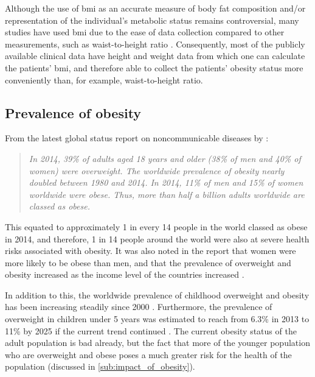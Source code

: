 Although the use of \gls{bmi} as an accurate measure of body fat composition and/or representation of the individual's metabolic status remains controversial, many studies have used \gls{bmi} due to the ease of data collection compared to other measurements, such as waist-to-height ratio \citep{Lee2008, Gelber2008}.
Consequently, most of the publicly available clinical data have height and weight data from which one can calculate the patients' \gls{bmi}, and therefore able to collect the patients' obesity status more conveniently than, for example, waist-to-height ratio.

\subsection{Prevalence of obesity}
\label{sub:prevalence_of_obesity}

From the latest global status report on noncommunicable diseases by \citet{WHO2014}:
\begin{quote}
	\textit{
		In 2014, 39\% of adults aged 18 years and older (38\% of men and 40\% of women) were overweight.
		The worldwide prevalence of obesity nearly doubled between 1980 and 2014.
		In 2014, 11\% of men and 15\% of women worldwide were obese.
		Thus, more than half a billion adults worldwide are classed as obese.
	}
\end{quote}

\noindent
This equated to approximately 1 in every 14 people in the world classed as obese in 2014, and therefore, 1 in 14 people around the world were also at severe health risks associated with obesity.
It was also noted in the report that women were more likely to be obese than men, and that the prevalence of overweight and obesity increased as the income level of the countries increased \citep{WHO2014}.

In addition to this, the worldwide prevalence of childhood overweight and obesity has been increasing steadily since 2000 \citep{WHO2014}.
Furthermore, the prevalence of overweight in children under 5 years was estimated to reach from 6.3\% in 2013 to 11\% by 2025 if the current trend continued \citep{WHO2014}.
The current obesity status of the adult population is bad already, but the fact that more of the younger population who are overweight and obese poses a much greater risk for the health of the population (discussed in \cref{sub:impact_of_obesity}).


